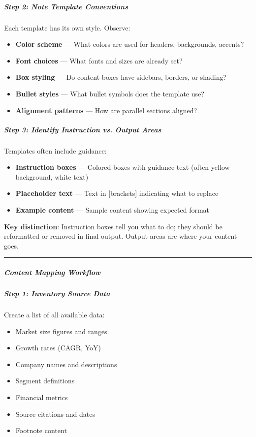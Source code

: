\documentclass[11pt]{article}
\begin{document}
\subparagraph{Step 2: Note Template Conventions}\mbox{}\par

Each template has its own style. Observe:

\begin{itemize}[leftmargin=*,itemsep=2pt,topsep=2pt]
\item {} \textbf{Color scheme} — What colors are used for headers, backgrounds, accents?
\item {} \textbf{Font choices} — What fonts and sizes are already set?
\item {} \textbf{Box styling} — Do content boxes have sidebars, borders, or shading?
\item {} \textbf{Bullet styles} — What bullet symbols does the template use?
\item {} \textbf{Alignment patterns} — How are parallel sections aligned?
\end{itemize}

\subparagraph{Step 3: Identify Instruction vs. Output Areas}\mbox{}\par

Templates often include guidance:

\begin{itemize}[leftmargin=*,itemsep=2pt,topsep=2pt]
\item {} \textbf{Instruction boxes} — Colored boxes with guidance text (often yellow background, white text)
\item {} \textbf{Placeholder text} — Text in [brackets] indicating what to replace
\item {} \textbf{Example content} — Sample content showing expected format
\end{itemize}

\textbf{Key distinction}: Instruction boxes tell you what to do; they should be reformatted or removed in final output. Output areas are where your content goes.


\vspace{0.5em}\hrule\vspace{0.5em}

\subparagraph{Content Mapping Workflow}\mbox{}\par

\subparagraph{Step 1: Inventory Source Data}\mbox{}\par

Create a list of all available data:

\begin{itemize}[leftmargin=*,itemsep=2pt,topsep=2pt]
\item {} Market size figures and ranges
\item {} Growth rates (CAGR, YoY)
\item {} Company names and descriptions
\item {} Segment definitions
\item {} Financial metrics
\item {} Source citations and dates
\item {} Footnote content
\end{itemize}
\end{document}
